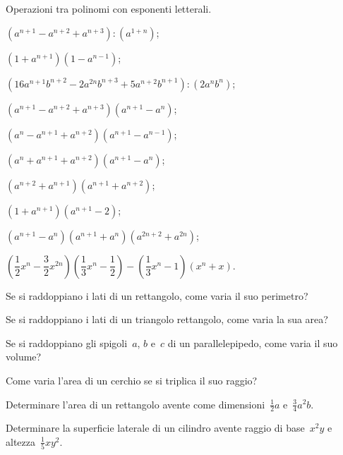 \begin{esercizio}[\Ast]
\label{ese:11.54}
 Operazioni tra polinomi con esponenti letterali.

\begin{enumeratea}
\item $\left(a^{n+1}-a^{n+2}+a^{n+3}\right):\left(a^{1+n}\right)$;
\item $\left(1+a^{n+1}\right)\left(1-a^{n-1}\right)$;
\item $\left(16a^{n+1}b^{n+2}-2a^{2n}b^{n+3}+5a^{n+2}b^{n+1}\right):\left(2a^{n}b^{n}\right)$;
\item $\left(a^{n+1}-a^{n+2}+a^{n+3}\right)\left(a^{n+1}-a^{n}\right)$;
\item $\left(a^{n}-a^{n+1}+a^{n+2}\right)\left(a^{n+1}-a^{n-1}\right)$;
\item $\left(a^{n}+a^{n+1}+a^{n+2}\right)\left(a^{n+1}-a^{n}\right)$;
\item $\left(a^{n+2}+a^{n+1}\right)\left(a^{n+1}+a^{n+2}\right)$;
\item $\left(1+a^{n+1}\right)\left(a^{n+1}-2\right)$;
\item $\left(a^{n+1}-a^{n}\right)\left(a^{n+1}+a^{n}\right)\left(a^{2n+2}+a^{2n}\right)$;
\item $\left(\dfrac{1}{2}x^{n}-\dfrac{3}{2}x^{2n}\right)\left(\dfrac{1}{3}x^{n}-\dfrac{1}{2}\right)-\left(\dfrac{1}{3}x^{n}-1\right)\left(x^{n}+x\right)$.
\end{enumeratea}
\end{esercizio}
\begin{multicols}{2}
\begin{esercizio}
\label{ese:11.55}
 Se si raddoppiano i lati di un rettangolo, come varia il suo
perimetro?
\end{esercizio}

\begin{esercizio}
\label{ese:11.56}
 Se si raddoppiano i lati di un triangolo rettangolo, come varia la sua
area?
\end{esercizio}

\begin{esercizio}
\label{ese:11.57}
 Se si raddoppiano gli spigoli~$a$, $b$ e~$c$ di un parallelepipedo, come
varia il suo volume?
\end{esercizio}

\begin{esercizio}
\label{ese:11.58}
 Come varia l'area di un cerchio se si triplica il suo
raggio?
\end{esercizio}

\begin{esercizio}
\label{ese:11.59}
 Determinare l'area di un rettangolo avente come
dimensioni~$\frac{1}{2}a$ e~$\frac{3}{4}a^{2}b$.
\end{esercizio}

\begin{esercizio}
\label{ese:11.60}
 Determinare la superficie laterale di un cilindro avente raggio di
base~$x^{2}y$ e altezza~$\frac{1}{5}{xy}^{2}$.
\end{esercizio}
\end{multicols}

